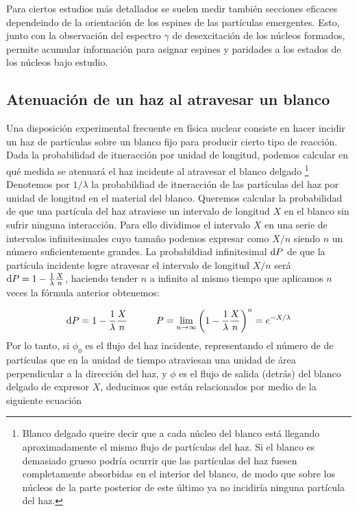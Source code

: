Para ciertos estudios más detallados se suelen medir también secciones eficaces dependeindo de la orientación de los espines de las partículas emergentes. Esto, junto con la observación del espectro $\gamma$ de desexcitación de los núcleos formados, permite acumular información para asignar espines y paridades a los estados de los núcleos bajo estudio.

\subsection{Atenuación de un haz al atravesar un blanco}

Una disposición experimental frecuente en física nuclear consiste en hacer incidir un haz de partículas sobre un blanco fijo para producir cierto tipo de reacción. Dada la probabilidad de itneracción por unidad de longitud, podemos calcular en qué medida se atenuará el haz incidente al atravesar el blanco delgado \footnote{Blanco delgado queire decir que a cada núcleo del blanco está llegando aproximadamente el mismo flujo de partículas del haz. Si el blanco es demasiado grueso podría ocurrir que las partículas del haz fuesen completamente absorbidas en el interior del blanco, de modo que sobre los núcleos de la parte posterior de este último ya no incidiría ninguna partícula del haz.} Denotemos por $1/\lambda$ la probabildiad de itneracción de las partículas del haz por unidad de longitud en el material del blanco. Queremos calcular la probabilidad de que una partícula del haz atraviese un intervalo de longitud $X$ en el blanco sin sufrir ninguna interacción. Para ello dividimos el intervalo $X$ en una serie de intervalos infinitesimales cuyo tamaño podemos expresar como $X/n$ siendo $n$ un número suficientemente grandes. La probabildiad infinitesimal $\mathrm{d} P$ de que la partícula incidente logre atravesar el intervalo de longitud $X/n$ será $\mathrm{d} P = 1 - \frac{1}{\lambda} \frac{X}{n}$, haciendo tender $n$ a infinito al mismo tiempo que aplicamos $n$ veces la fórmula anterior obtenemos:  

\begin{equation}
    \mathrm{d} P = 1 - \frac{1}{\lambda} \frac{X}{n} \quad \quad \quad P = \lim_{n\rightarrow \infty} \left( 1 - \frac{1}{\lambda}\frac{X}{n} \right)^n = e^{-X/\lambda}
\end{equation}
Por lo tanto, si $\phi_0$ es el flujo del haz incidente, representando el número de de partículas que en la unidad de tiempo atraviesan una unidad de área perpendicular a la dirección del haz, y $\phi$ es el flujo de salida (detrás) del blanco delgado de expresor $X$, deducimos que están relacionados por medio de la siguiente ecuación 

